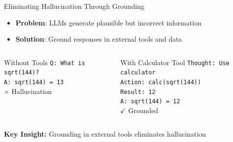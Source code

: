 \documentclass[aspectratio=169]{beamer}
\begin{document}
\begin{frame}{Eliminating Hallucination Through Grounding}
	\begin{itemize}
		\item {\color{highlight}\textbf{Problem}}: LLMs generate plausible but incorrect information
		\item {\color{highlight}\textbf{Solution}}: Ground responses in external tools and data
	\end{itemize}
	
	\begin{columns}
		\begin{block}{Without Tools}
			\small
			\texttt{Q: What is sqrt(144)?} \\
			\texttt{A: sqrt(144) = 13} \\
			{\color{red}$\times$ Hallucination}
		\end{block}
		
		\begin{block}{With Calculator Tool}
			\small
			\texttt{Thought: Use calculator} \\
			\texttt{Action: calc(sqrt(144))} \\
			\texttt{Result: 12} \\
			\texttt{A: sqrt(144) = 12} \\
			{\color{green}$\checkmark$ Grounded}
		\end{block}
	\end{columns}
	
	\vspace{0.5cm}
	
	\begin{center}
		\textbf{Key Insight:} {\color{highlight}Grounding in external tools eliminates hallucination}
	\end{center}
\end{frame}
\end{document}
